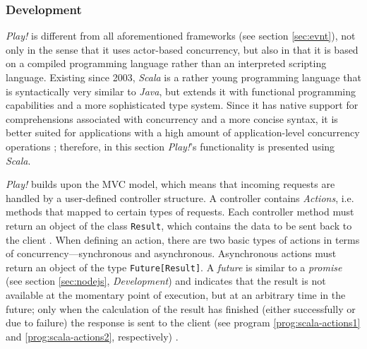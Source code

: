 \subsubsection*{Development}
\textit{Play!} is different from all aforementioned frameworks (see section \ref{sec:evnt}), not only in the sense that it uses actor-based concurrency, but also in that it is based on a compiled programming language rather than an interpreted scripting language. Existing since 2003, \textit{Scala} is a rather young programming language that is syntactically very similar to \textit{Java}, but extends it with functional programming capabilities and a more sophisticated type system. Since it has native support for comprehensions associated with concurrency and a more concise syntax, it is better suited for applications with a high amount of application-level concurrency operations \cite[p. 9]{Scala}; therefore, in this section \textit{Play!}'s functionality is presented using \textit{Scala}.

\textit{Play!} builds upon the MVC model, which means that incoming requests are handled by a user-defined controller structure. A controller contains \textit{Actions}, i.e. methods that mapped to certain types of requests. Each controller method must return an object of the class \texttt{Result}, which contains the data to be sent back to the client \cite[p. 27]{Reelsen2011}. When defining an action, there are two basic types of actions in terms of concurrency---synchronous and asynchronous. Asynchronous actions must return an object of the type \texttt{Future[Result]}. A \textit{future} is similar to a \textit{promise} (see section \ref{sec:nodejs}, \textit{Development}) and indicates that the result is not available at the momentary point of execution, but at an arbitrary time in the future; only when the calculation of the result has finished (either successfully or due to failure) the response is sent to the client (see program \ref{prog:scala-actions1} and \ref{prog:scala-actions2}, respectively) \cite[p. 86]{Scala}.

